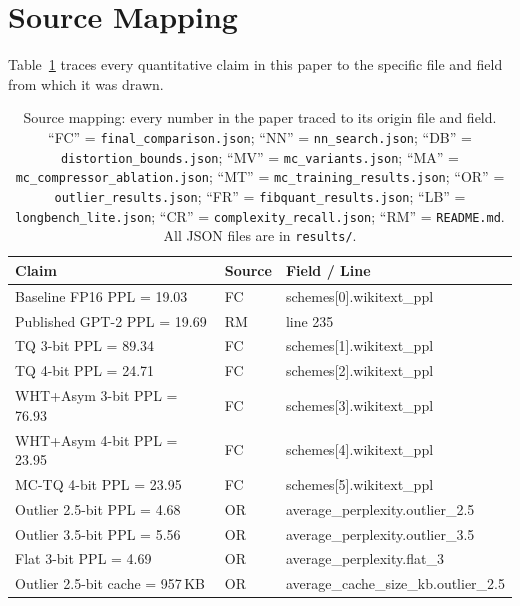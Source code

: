 
\section{Source Mapping}
\label{app:source_mapping}

Table~\ref{tab:source_map} traces every quantitative claim in this paper
to the specific file and field from which it was drawn.

\begin{table}[H]
\centering
\caption{Source mapping: every number in the paper traced to its origin
file and field.
``FC'' = \texttt{final\_comparison.json};
``NN'' = \texttt{nn\_search.json};
``DB'' = \texttt{distortion\_bounds.json};
``MV'' = \texttt{mc\_variants.json};
``MA'' = \texttt{mc\_compressor\_ablation.json};
``MT'' = \texttt{mc\_training\_results.json};
``OR'' = \texttt{outlier\_results.json};
``FR'' = \texttt{fibquant\_results.json};
``LB'' = \texttt{longbench\_lite.json};
``CR'' = \texttt{complexity\_recall.json};
``RM'' = \texttt{README.md}.
All JSON files are in \texttt{results/}.}
\label{tab:source_map}
\scriptsize
\begin{tabular}{@{}p{4.2cm}lp{4.5cm}@{}}
\toprule
\textbf{Claim} & \textbf{Source} & \textbf{Field / Line} \\
\midrule
Baseline FP16 PPL = 19.03
  & FC & schemes[0].wikitext\_ppl \\
Published GPT-2 PPL = 19.69
  & RM & line 235 \\
TQ 3-bit PPL = 89.34
  & FC & schemes[1].wikitext\_ppl \\
TQ 4-bit PPL = 24.71
  & FC & schemes[2].wikitext\_ppl \\
WHT+Asym 3-bit PPL = 76.93
  & FC & schemes[3].wikitext\_ppl \\
WHT+Asym 4-bit PPL = 23.95
  & FC & schemes[4].wikitext\_ppl \\
MC-TQ 4-bit PPL = 23.95
  & FC & schemes[5].wikitext\_ppl \\
Outlier 2.5-bit PPL = 4.68
  & OR & average\_perplexity.outlier\_2.5 \\
Outlier 3.5-bit PPL = 5.56
  & OR & average\_perplexity.outlier\_3.5 \\
Flat 3-bit PPL = 4.69
  & OR & average\_perplexity.flat\_3 \\
Outlier 2.5-bit cache = 957\,KB
  & OR & average\_cache\_size\_kb.outlier\_2.5 \\

\end{tabular}
\end{table}
